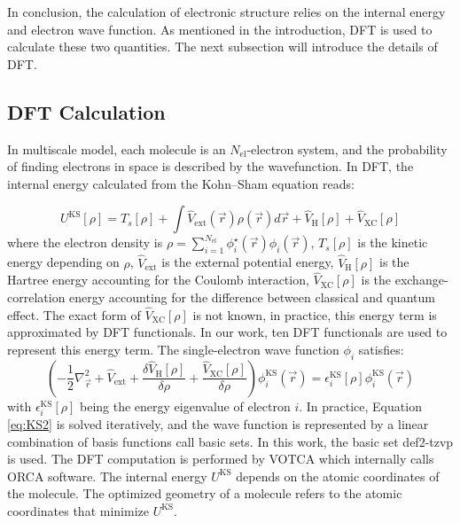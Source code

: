 \documentclass[letterpaper,12pt]{article}
\begin{document}
In conclusion, the calculation of electronic structure relies on the internal energy and electron wave function. As mentioned in the introduction, DFT is used to calculate these two quantities. The next subsection will introduce the details of DFT.

\subsection{DFT Calculation}
In multiscale model, each molecule is an $N_\text{el}$-electron system, and the probability of finding electrons in space is described by the wavefunction.
In DFT, the internal energy calculated from the Kohn–Sham equation \cite{kohn_self_1965} reads:

\begin{equation}
    U^\text{KS}[\rho] = T_s[\rho] + \int \hat{V}_\text{ext}(\vec{r}) \rho(\vec{r}) d \vec{r} + \hat{V}_\text{H}[\rho] + \hat{V}_\text{XC}[\rho]
    \label{eq:KS_model}
\end{equation}
where the electron density is $\rho=\sum\limits_{i=1}^{N_\text{el}} \phi_i^\star(\vec{r}) \phi_i(\vec{r})$, $T_s[\rho]$ is the kinetic energy depending on $\rho$,  $\hat{V}_\text{ext}$ is the external potential energy,  $\hat{V}_\text{H}[\rho]$ is the Hartree energy accounting for the Coulomb interaction, $\hat{V}_\text{XC}[\rho]$ is the exchange-correlation energy accounting for the difference between classical and quantum effect. The exact form of $\hat{V}_\text{XC}[\rho]$ is not known, in practice, this energy term is approximated by DFT functionals. In our work, ten DFT functionals are used to represent this energy term. 
The single-electron wave function $\phi_i$ satisfies: 
\begin{equation}
    (-\frac{1}{2}\nabla^2_{\vec{r}} + \hat{V}_\text{ext} + \frac{\delta \hat{V}_\text{H}[\rho]}{\delta \rho} + \frac{\hat{V}_\text{XC}[\rho]}{\delta \rho}) \phi_i^\text{KS}(\vec{r}) =  \epsilon^\text{KS}_i[\rho] \phi^\text{KS}_i (\vec{r}) 
    \label{eq:KS2}
\end{equation}
with $\epsilon^\text{KS}_i[\rho]$ being the energy eigenvalue of electron $i$. 
In practice, Equation \ref{eq:KS2} is solved iteratively, and the wave function is represented by a linear combination of basis functions call basic sets. 
In this work, the basic set def2-tzvp \cite{weigend_accurate_2006} is used. The DFT computation is performed by VOTCA \cite{Baumeier2011} which internally calls ORCA software.
The internal energy $U^\text{KS}$ depends on the atomic coordinates of the molecule. The optimized geometry of a molecule refers to the atomic coordinates that minimize $U^\text{KS}$.
\end{document}
